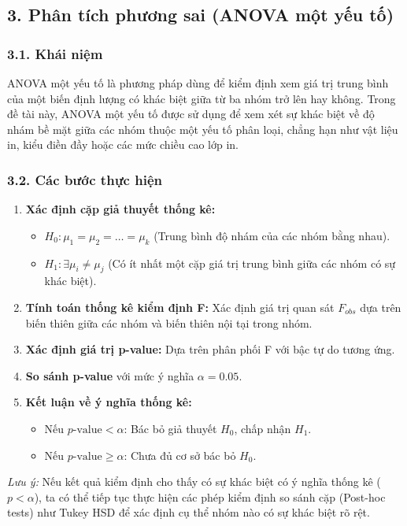 \subsection{3. Phân tích phương sai (ANOVA một yếu tố)}
\subsubsection{3.1. Khái niệm}
ANOVA một yếu tố là phương pháp dùng để kiểm định xem giá trị trung bình của một biến định lượng có khác biệt giữa từ ba nhóm trở lên hay không. Trong đề tài này, ANOVA một yếu tố được sử dụng để xem xét sự khác biệt về độ nhám bề mặt giữa các nhóm thuộc một yếu tố phân loại, chẳng hạn như vật liệu in, kiểu điền đầy hoặc các mức chiều cao lớp in.

\subsubsection{3.2. Các bước thực hiện}
\begin{enumerate}
    \item \textbf{Xác định cặp giả thuyết thống kê:}
    \begin{itemize}
        \item $H_0: \mu_1 = \mu_2 = \dots = \mu_k$ (Trung bình độ nhám của các nhóm bằng nhau).
        \item $H_1: \exists \mu_i \neq \mu_j$ (Có ít nhất một cặp giá trị trung bình giữa các nhóm có sự khác biệt).
    \end{itemize}
    \item \textbf{Tính toán thống kê kiểm định F:} Xác định giá trị quan sát $F_{obs}$ dựa trên biến thiên giữa các nhóm và biến thiên nội tại trong nhóm.
    \item \textbf{Xác định giá trị p-value:} Dựa trên phân phối F với bậc tự do tương ứng.
    \item \textbf{So sánh p-value} với mức ý nghĩa $\alpha = 0.05$.
    \item \textbf{Kết luận về ý nghĩa thống kê:}
    \begin{itemize}
        \item Nếu $p\text{-value} < \alpha$: Bác bỏ giả thuyết $H_0$, chấp nhận $H_1$.
        \item Nếu $p\text{-value} \ge \alpha$: Chưa đủ cơ sở bác bỏ $H_0$.
    \end{itemize}
\end{enumerate}
\textit{Lưu ý:} Nếu kết quả kiểm định cho thấy có sự khác biệt có ý nghĩa thống kê ($p < \alpha$), ta có thể tiếp tục thực hiện các phép kiểm định so sánh cặp (Post-hoc tests) như Tukey HSD để xác định cụ thể nhóm nào có sự khác biệt rõ rệt.

